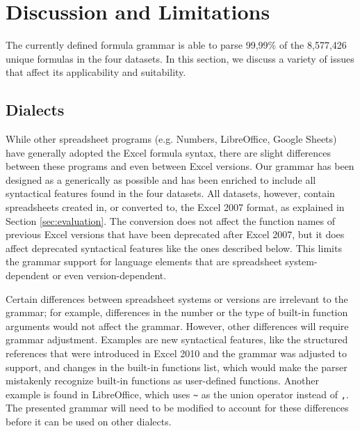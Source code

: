 \documentclass[times]{smrauth}
\begin{document}
\section{Discussion and Limitations}
\label{sec:discussion}
The currently defined formula grammar is able to parse 99,99\% of the 8,577,426 unique formulas in the four datasets. In this section, we discuss a variety of issues that affect its applicability and suitability.

\subsection{Dialects}

While other spreadsheet programs (e.g. Numbers, LibreOffice, Google Sheets) have generally adopted the Excel formula syntax, there are slight differences between these programs and even between Excel versions.
Our grammar has been designed as a generically as possible and has been enriched to include all syntactical features found in the four datasets.
All datasets, however, contain spreadsheets created in, or converted to, the Excel 2007 format, as explained in Section \ref{sec:evaluation}.
The conversion does not affect the function names of previous Excel versions that have been deprecated after Excel 2007, but it does affect deprecated syntactical features like the ones described below. This limits the grammar support for language elements that are spreadsheet system-dependent or even version-dependent.

Certain differences between spreadsheet systems or versions are irrelevant to the grammar; for example, differences in the number or the type of built-in function arguments would not affect the grammar. However, other differences will require grammar adjustment. Examples are new syntactical features, like the structured references that were introduced in Excel 2010 and the grammar was adjusted to support, and changes in the built-in functions list, which would make the parser mistakenly recognize built-in functions as user-defined functions.
Another example is found in LibreOffice, which uses \texttt{\~} as the union operator instead of \texttt{,}.
The presented grammar will need to be modified to account for these differences before it can be used on other dialects.
\end{document}
